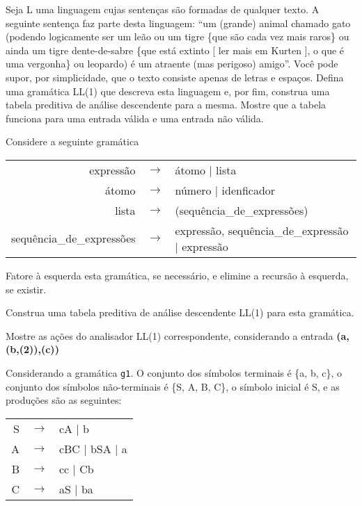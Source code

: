 \documentclass{compiladores}
\begin{document}
\begin{listanumerada}
\item Seja L uma linguagem cujas sentenças são formadas de qualquer
  texto. A seguinte sentença faz parte desta linguagem: ``um (grande)
  animal chamado gato (podendo logicamente ser um leão ou um tigre
  \{que são cada vez mais raros\} ou ainda um tigre dente-de-sabre
  \{que está extinto [ ler mais em Kurten ], o que é uma vergonha\} ou
  leopardo) é um atraente (mas perigoso) amigo''. Você pode supor, por
  simplicidade, que o texto consiste apenas de letras e
  espaços. Defina uma gramática LL(1) que descreva esta linguagem e,
  por fim, construa uma tabela preditiva de análise descendente para a
  mesma. Mostre que a tabela funciona para uma entrada válida e uma
  entrada não válida.

\item Considere a seguinte gramática \\
    \begin{tabular}{rcl}
      expressão & $\rightarrow$ & átomo | lista \\
      átomo & $\rightarrow$ & número | idenficador \\
      lista & $\rightarrow$ & (sequência\_de\_expressões) \\
      sequência\_de\_expressões & $\rightarrow$ & expressão, sequência\_de\_expressão | expressão \\
    \end{tabular}
    \begin{lista}
      \item Fatore à esquerda esta gramática, se necessário, e elimine a recursão à esquerda, se existir.
      \item Construa uma tabela preditiva de análise descendente LL(1) para esta gramática.
      \item Mostre as ações do analisador LL(1) correspondente, considerando a entrada {\bf (a,(b,(2)),(c))}
    \end{lista}

\item Considerando a gramática \texttt{g1}. O conjunto dos símbolos
  terminais é \{a, b, c\}, o conjunto dos símbolos não-terminais é
  \{S, A, B, C\}, o símbolo inicial é S, e as produções são as
  seguintes: \\
  \begin{tabular}{rcl}
    S & $\rightarrow$ & cA | b \\
    A & $\rightarrow$ & cBC | bSA | a \\
    B & $\rightarrow$ & cc | Cb \\
    C & $\rightarrow$ & aS | ba \\
  \end{tabular}


\end{listanumerada}
\end{document}
